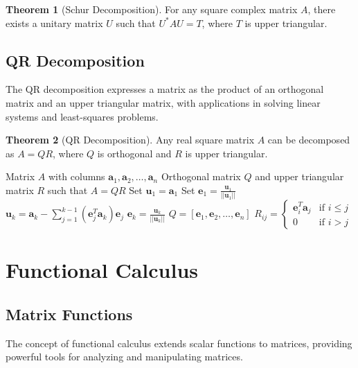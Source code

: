 \documentclass[12pt,a4paper]{article}
\theoremstyle{definition}
\newtheorem{theorem}{Theorem}[section]
\begin{document}
\begin{theorem}[Schur Decomposition]
For any square complex matrix $A$, there exists a unitary matrix $U$ such that $U^*AU = T$, where $T$ is upper triangular.
\end{theorem}

\subsection{QR Decomposition}
The QR decomposition expresses a matrix as the product of an orthogonal matrix and an upper triangular matrix, with applications in solving linear systems and least-squares problems.

\begin{theorem}[QR Decomposition]
Any real square matrix $A$ can be decomposed as $A = QR$, where $Q$ is orthogonal and $R$ is upper triangular.
\end{theorem}

\begin{algorithm}
\caption{Gram-Schmidt Process for QR Decomposition}
\begin{algorithmic}[1]
\Require Matrix $A$ with columns $\mathbf{a}_1, \mathbf{a}_2, \ldots, \mathbf{a}_n$
\Ensure Orthogonal matrix $Q$ and upper triangular matrix $R$ such that $A = QR$
\State Set $\mathbf{u}_1 = \mathbf{a}_1$
\State Set $\mathbf{e}_1 = \frac{\mathbf{u}_1}{||\mathbf{u}_1||}$
    \State $\mathbf{u}_k = \mathbf{a}_k - \sum_{j=1}^{k-1} (\mathbf{e}_j^T \mathbf{a}_k) \mathbf{e}_j$
    \State $\mathbf{e}_k = \frac{\mathbf{u}_k}{||\mathbf{u}_k||}$
\EndFor
\State $Q = [\mathbf{e}_1, \mathbf{e}_2, \ldots, \mathbf{e}_n]$
\State $R_{ij} = 
\begin{cases}
\mathbf{e}_i^T \mathbf{a}_j & \text{if } i \leq j \\
0 & \text{if } i > j
\end{cases}$
\end{algorithmic}
\end{algorithm}

\section{Functional Calculus}

\subsection{Matrix Functions}
The concept of functional calculus extends scalar functions to matrices, providing powerful tools for analyzing and manipulating matrices.
\end{document}

